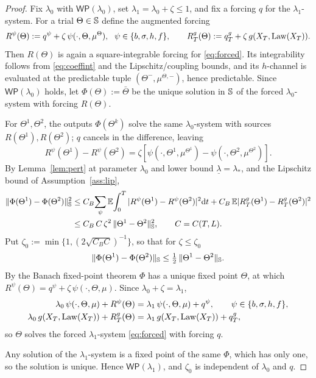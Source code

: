 \begin{proof}
Fix $\lambda_0$ with $\mathsf{WP}(\lambda_0)$, set $\lambda_1=\lambda_0+\zeta\le1$, and
fix a forcing $q$ for the $\lambda_1$-system. For a trial $\Theta\in\mathbb{S}$ define the
augmented forcing
\[
R^\psi(\Theta):=q^\psi+\zeta\,\psi(\cdot,\Theta,\mu^\Theta),\ \ \psi\in\{b,\sigma,h,f\},
\qquad R^g_T(\Theta):=q^g_T+\zeta\,g(X_T,\Law(X_T)).
\]
Then $R(\Theta)$ is
again a square-integrable forcing for \eqref{eq:forced}. Its integrability follows from
\eqref{eq:coeffint} and the Lipschitz/coupling bounds, and its $h$-channel is evaluated at
the predictable tuple $(\Theta^-,\mu^{\Theta,-})$, hence predictable.
Since $\mathsf{WP}(\lambda_0)$ holds, let $\Phi(\Theta):=\bar\Theta$ be the unique
solution in $\mathbb{S}$ of the forced $\lambda_0$-system with forcing $R(\Theta)$.

For $\Theta^1,\Theta^2$, the outputs $\Phi(\Theta^k)$ solve the same $\lambda_0$-system
with sources $R(\Theta^1),R(\Theta^2)$; $q$ cancels in the difference, leaving
\[
R^\psi(\Theta^1)-R^\psi(\Theta^2)=\zeta[\psi(\cdot,\Theta^1,\mu^{\Theta^1})-\psi(\cdot,\Theta^2,\mu^{\Theta^2})].
\]
By Lemma~\ref{lem:pert} at parameter $\lambda_0$ and lower bound
$\underline\lambda=\lambda_*$, and the
Lipschitz bound of Assumption~\ref{ass:lip},
\[
\begin{aligned}
\|\Phi(\Theta^1)-\Phi(\Theta^2)\|_{\mathbb{S}}^2
&\le C_B\!\sum_\psi\mathbb{E}\!\int_0^T|R^\psi(\Theta^1)-R^\psi(\Theta^2)|^2\mathrm{d} t
+C_B\,\mathbb{E}|R^g_T(\Theta^1)-R^g_T(\Theta^2)|^2\\
&\le C_B\,C\,\zeta^2\,\|\Theta^1-\Theta^2\|_{\mathbb{S}}^2 ,\qquad C=C(T,L) .
\end{aligned}
\]
Put $\zeta_0:=\min\{1,(2\sqrt{C_BC})^{-1}\}$, so that for $\zeta\le\zeta_0$
\[
\|\Phi(\Theta^1)-\Phi(\Theta^2)\|_{\mathbb{S}}\le\tfrac12\,\|\Theta^1-\Theta^2\|_{\mathbb{S}} .
\]
By the Banach fixed-point theorem $\Phi$ has a unique fixed point $\Theta$, at which
$R^\psi(\Theta)=q^\psi+\zeta\,\psi(\cdot,\Theta,\mu)$. Since $\lambda_0+\zeta=\lambda_1$,
\[
\begin{aligned}
\lambda_0\,\psi(\cdot,\Theta,\mu)+R^\psi(\Theta)&=\lambda_1\,\psi(\cdot,\Theta,\mu)+q^\psi ,
\qquad\psi\in\{b,\sigma,h,f\},\\
\lambda_0\,g(X_T,\mathrm{Law}(X_T))+R^g_T(\Theta)&=\lambda_1\,g(X_T,\mathrm{Law}(X_T))+q^g_T ,
\end{aligned}
\]
so $\Theta$ solves the forced $\lambda_1$-system \eqref{eq:forced} with forcing $q$.

Any solution of the $\lambda_1$-system is a fixed point of the same $\Phi$, which has only
one, so the solution is unique. Hence $\mathsf{WP}(\lambda_1)$, and $\zeta_0$ is
independent of $\lambda_0$ and $q$.
\end{proof}

